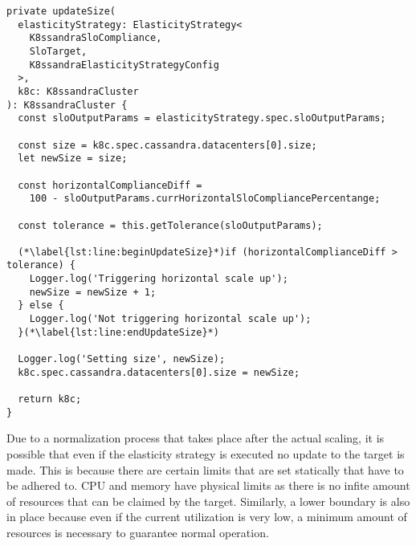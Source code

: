 \begin{lstlisting}[caption={Method of diagonal elasticity strategy controller which manages horizontal scaling},
                    captionpos=b,
                    label=lst:diagonal-elasticity:updateSize,
                    float]
private updateSize(
  elasticityStrategy: ElasticityStrategy<
    K8ssandraSloCompliance,
    SloTarget,
    K8ssandraElasticityStrategyConfig
  >,
  k8c: K8ssandraCluster
): K8ssandraCluster {
  const sloOutputParams = elasticityStrategy.spec.sloOutputParams;

  const size = k8c.spec.cassandra.datacenters[0].size;
  let newSize = size;

  const horizontalComplianceDiff =
    100 - sloOutputParams.currHorizontalSloCompliancePercentange;

  const tolerance = this.getTolerance(sloOutputParams);

  (*\label{lst:line:beginUpdateSize}*)if (horizontalComplianceDiff > tolerance) {
    Logger.log('Triggering horizontal scale up');
    newSize = newSize + 1;
  } else {
    Logger.log('Not triggering horizontal scale up');
  }(*\label{lst:line:endUpdateSize}*)

  Logger.log('Setting size', newSize);
  k8c.spec.cassandra.datacenters[0].size = newSize;

  return k8c;
}
\end{lstlisting}

Due to a normalization process that takes place after the actual scaling, it is possible that even if the elasticity strategy is executed no update to the target is made. This is because there are certain limits that are set statically that have to be adhered to. CPU and memory have physical limits as there is no infite amount of resources that can be claimed by the target. Similarly, a lower boundary is also in place because even if the current utilization is very low, a minimum amount of resources is necessary to guarantee normal operation.

